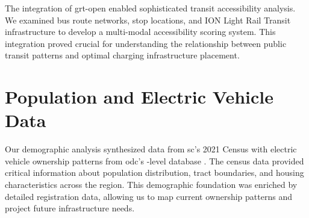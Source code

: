 

The integration of \gls{grt-open} \cite{rowdata2024} enabled sophisticated transit accessibility analysis. We examined bus route networks, stop locations, and ION Light Rail Transit infrastructure to develop a multi-modal accessibility scoring system. This integration proved crucial for understanding the relationship between public transit patterns and optimal charging infrastructure placement.

\section{Population and Electric Vehicle Data}



Our demographic analysis synthesized data from \gls{sc}'s 2021 Census \cite{statcan2021} with electric vehicle ownership patterns from \gls{odc}'s -level database \cite{ontario2024}. The census data provided critical information about population distribution, tract boundaries, and housing characteristics across the region. This demographic foundation was enriched by detailed  registration data, allowing us to map current ownership patterns and project future infrastructure needs.